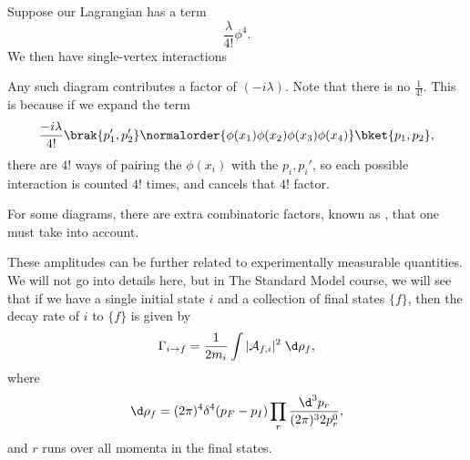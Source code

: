 \documentclass[a4paper]{article}
\begin{document}
\begin{eg}
  Suppose our Lagrangian has a term
  \[
    \frac{\lambda}{4!} \phi^4.
  \]
  We then have single-vertex interactions
  \begin{center}
  \end{center}
  Any such diagram contributes a factor of $(-i\lambda)$. Note that there is no $\frac{1}{4!}$. This is because if we expand the term
  \[
    \frac{-i \lambda}{4!} \brak{p_1', p_2'} \normalorder{\phi(x_1)\phi(x_2)\phi(x_3)\phi(x_4)}\bket{p_1, p_2},
  \]
  there are $4!$ ways of pairing the $\phi(x_i)$ with the $p_i, p_i'$, so each possible interaction is counted $4!$ times, and cancels that $4!$ factor.

  For some diagrams, there are extra combinatoric factors, known as , that one must take into account.
\end{eg}

These amplitudes can be further related to experimentally measurable quantities. We will not go into details here, but in The Standard Model course, we will see that if we have a single initial state $i$ and a collection of final states $\{f\}$, then the decay rate of $i$ to $\{f\}$ is given by
\[
  \Gamma_{i \to f} = \frac{1}{2 m_i} \int |\mathcal{A}_{f,i}|^2 \;\d \rho_f,
\]
where
\[
  \d \rho_f = (2\pi)^4 \delta^4(p_F - p_I) \prod_r \frac{\d^3 p_r}{(2\pi)^3 2 p_r^0},
\]
and $r$ runs over all momenta in the final states.
\end{document}

